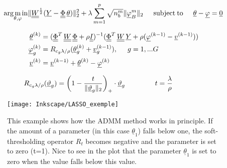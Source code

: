  \begin{equation}
	\mathrm{arg \underset{\theta, \varphi} min} \Vert \underline{\underline{W}}^{\frac{1}{2}} (\underline{Y}-\underline{\underline{\Phi}} \, \underline{\theta}) \Vert^2_2 + \lambda \sum_{m=1}^p \sqrt{n^m_b} \Vert \underline{\varphi}^m_B \Vert_2 \hspace{0.5cm} \mathrm{subject \: to} \hspace{0.5cm} \underline{\theta} - \underline{\varphi} = \underline{0}
	\label{eq:admm_extended}
\end{equation}




\begin{align}
	\underline{\theta}^{(k)} &= (\underline{\underline{\Phi}}^T \, \underline{\underline{W}} \, \underline{\underline{\Phi}} + \rho \underline{\underline{I}})^{-1}(\underline{\underline{\Phi}}^T \, \underline{\underline{W}} \, \underline{Y} + \rho (\underline{\varphi}^{(k-1)}-\underline{v}^{(k-1)})) \label{eq:eq1} \\ 
	\underline{\varphi}^{(k)}_g &= R_{c_g \lambda/ \rho}(\underline{\theta}_g^{(k)}+\underline{v}_g^{(k-1)}), \hspace{0.5cm} g= 1,...G  \label{eq:eq2} \\ 
	\underline{v}^{(k)} &= \underline{v}^{(k-1)}+ \underline{\theta}^{(k)}-\underline{\varphi}^{(k)}
	\label{eq:eq3}
\end{align}


 \begin{equation}
	R_{c_g \lambda/ \rho}(\underline{\vartheta}_g) =\biggl( 1-\frac{t}{\Vert \underline{\vartheta}_g \Vert_2}\biggr)_+  \cdot\underline{\vartheta}_g \hspace{1.5cm} t=\frac{\lambda}{\rho} \hspace{1.5cm}
	\label{eq:thresholdop}
\end{equation}




\begin{figure}[!htb]
    \centering
    \texttt{[image: Inkscape/LASSO\_exemple]} %
    \caption[Example of 2D Group LASSO Problem]{This example shows how the ADMM method works in principle. If the amount of a parameter (in this case $\underline{\theta}_1$) falls below one, the soft-thresholding operator $R_t$ becomes negative and the parameter is set to zero (t=1). Nice to see in the plot that the parameter $\underline{\theta}_1$ is set to zero when the value falls below this value. 
}
    \label{fig:LASSO_exemple}
\end{figure}



